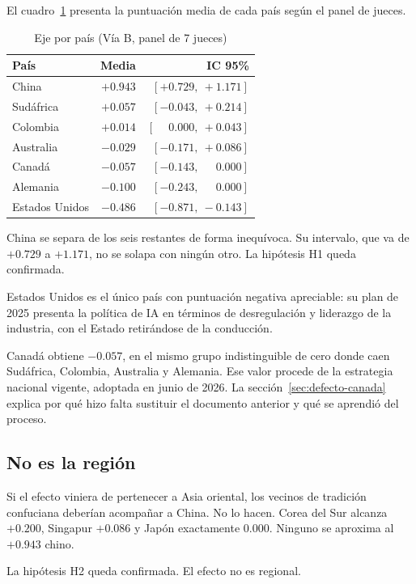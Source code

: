 El cuadro~\ref{tab:paises} presenta la puntuación media de cada país según el panel de jueces.

\begin{table}[htbp]
\centering
\caption{Eje \ejedf por país (Vía B, panel de 7 jueces)}
\label{tab:paises}
\begin{tabular}{lrr}
\hline
\textbf{País} & \textbf{Media} & \textbf{IC 95\%} \\
\hline
China & $+0.943$ & $[+0.729,\ +1.171]$ \\
Sudáfrica & $+0.057$ & $[-0.043,\ +0.214]$ \\
Colombia & $+0.014$ & $[\phantom{+}0.000,\ +0.043]$ \\
Australia & $-0.029$ & $[-0.171,\ +0.086]$ \\
Canadá & $-0.057$ & $[-0.143,\ \phantom{+}0.000]$ \\
Alemania & $-0.100$ & $[-0.243,\ \phantom{+}0.000]$ \\
Estados Unidos & $-0.486$ & $[-0.871,\ -0.143]$ \\
\hline
\end{tabular}
\end{table}

China se separa de los seis restantes de forma inequívoca. Su intervalo, que va de $+0.729$ a $+1.171$, no se solapa con ningún otro. La hipótesis H1 queda confirmada.

Estados Unidos es el único país con puntuación negativa apreciable: su plan de 2025 presenta la política de IA en términos de desregulación y liderazgo de la industria, con el Estado retirándose de la conducción.

Canadá obtiene $-0.057$, en el mismo grupo indistinguible de cero donde caen Sudáfrica, Colombia, Australia y Alemania. Ese valor procede de la estrategia nacional vigente, adoptada en junio de 2026. La sección~\ref{sec:defecto-canada} explica por qué hizo falta sustituir el documento anterior y qué se aprendió del proceso.

\subsection{No es la región}

Si el efecto viniera de pertenecer a Asia oriental, los vecinos de tradición confuciana deberían acompañar a China. No lo hacen. Corea del Sur alcanza $+0.200$, Singapur $+0.086$ y Japón exactamente $0.000$. Ninguno se aproxima al $+0.943$ chino.

La hipótesis H2 queda confirmada. El efecto no es regional.

